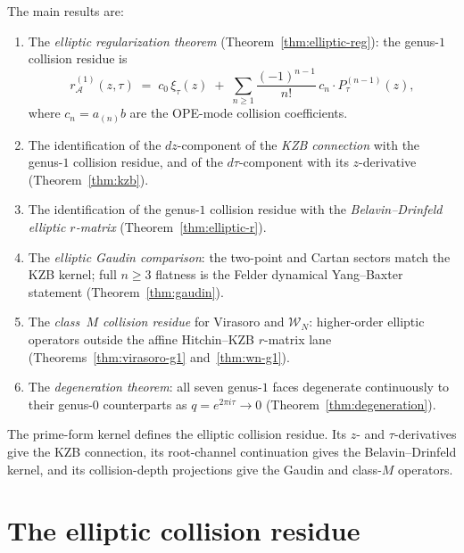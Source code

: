 \documentclass[11pt]{article}
\theoremstyle{plain}
\theoremstyle{definition}
\theoremstyle{remark}
\newcommand{\cA}{\mathcal{A}}
\newcommand{\cW}{\mathcal{W}}
\numberwithin{equation}{section}
\begin{document}
The main results are:
\begin{enumerate}[label=(\arabic*)]
\item The \emph{elliptic regularization theorem}
(Theorem~\ref{thm:elliptic-reg}): the genus-$1$ collision residue is
\[
r_\cA^{(1)}(z,\tau)
\;=\;
c_0\,\xi_\tau(z)
\;+\;
\sum_{n \geq 1}
\frac{(-1)^{n-1}}{n!}\,c_n \cdot P_\tau^{(n-1)}(z),
\]
where $c_n = a_{(n)}b$ are the OPE-mode collision coefficients.

\item The identification of the $dz$-component of the \emph{KZB
connection} with the genus-$1$ collision residue, and of the
$d\tau$-component with its $z$-derivative
(Theorem~\ref{thm:kzb}).

\item The identification of the genus-$1$ collision residue with
the \emph{Belavin--Drinfeld elliptic $r$-matrix}
(Theorem~\ref{thm:elliptic-r}).

\item The \emph{elliptic Gaudin comparison}: the two-point and Cartan
sectors match the KZB kernel; full \(n\geq3\) flatness is the Felder
dynamical Yang--Baxter statement (Theorem~\ref{thm:gaudin}).

\item The \emph{class~$M$ collision residue} for Virasoro and
$\cW_N$: higher-order elliptic operators outside the affine
Hitchin--KZB \(r\)-matrix lane
(Theorems~\ref{thm:virasoro-g1} and~\ref{thm:wn-g1}).

\item The \emph{degeneration theorem}: all seven genus-$1$ faces
degenerate continuously to their genus-$0$ counterparts as
$q = e^{2\pi i\tau} \to 0$ (Theorem~\ref{thm:degeneration}).
\end{enumerate}

The prime-form kernel defines the elliptic collision residue. Its
\(z\)- and \(\tau\)-derivatives give the KZB connection, its
root-channel continuation gives the Belavin--Drinfeld kernel, and its
collision-depth projections give the Gaudin and class-\(M\) operators.



\section{The elliptic collision residue}\label{sec:propagator}
\end{document}
